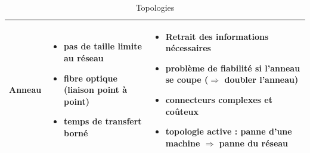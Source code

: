 \documentclass[11pt,english,french]{scrreprt}
\theoremstyle{remark}
\theoremstyle{definition}
\begin{document}
\begin{table}
\begin{tabularx}{\textwidth}{>{\bfseries}lXX}
	Anneau 	& \begin{itemize}
		\item pas de taille limite au réseau
		\item fibre optique (liaison point à point)
		\item temps de transfert borné
	\end{itemize} & \begin{itemize}
		\item Retrait des informations nécessaires
		\item problème de fiabilité si l'anneau se coupe ($\Rightarrow$ doubler l'anneau)
		\item connecteurs complexes et coûteux
		\item topologie active : panne d'une machine $\Rightarrow$  panne du réseau
	\end{itemize}\\[0.05in]
	\bottomrule
\end{tabularx}
\caption{Topologies}
\end{table}
\end{document}
